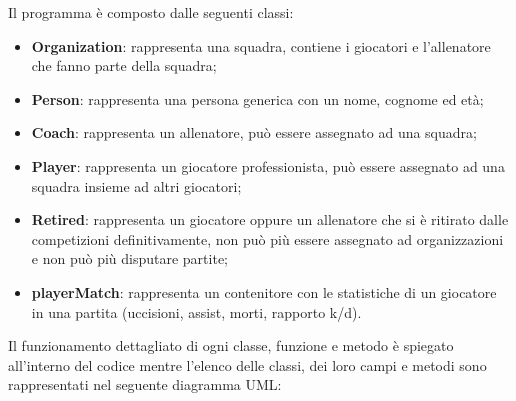 \documentclass[a4paper, 11pt]{article}
\begin{document}
Il programma è composto dalle seguenti classi:
\begin{itemize}
\item \textbf{Organization}: rappresenta una squadra, contiene i giocatori e l'allenatore che fanno parte della squadra;
\item \textbf{Person}: rappresenta una persona generica con un nome, cognome ed età;
\item \textbf{Coach}: rappresenta un allenatore, può essere assegnato ad una squadra;
\item \textbf{Player}: rappresenta un giocatore professionista, può essere assegnato ad una squadra insieme ad altri giocatori;
\item \textbf{Retired}: rappresenta un giocatore oppure un allenatore che si è ritirato dalle competizioni definitivamente, non può più essere assegnato ad organizzazioni e non può più disputare partite;
\item \textbf{playerMatch}: rappresenta un contenitore con le statistiche di un giocatore in una partita (uccisioni, assist, morti, rapporto k/d).
\end{itemize}
Il funzionamento dettagliato di ogni classe, funzione e metodo è spiegato all'interno del codice mentre l'elenco delle classi, dei loro campi e metodi sono rappresentati nel seguente diagramma UML:
\end{document}
